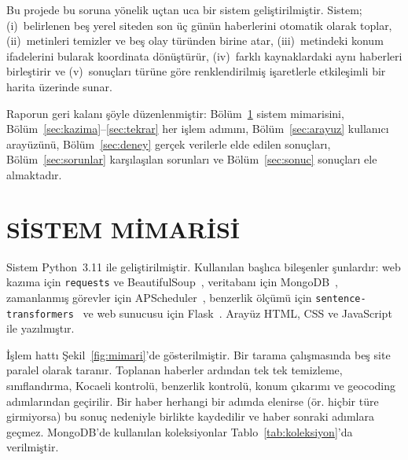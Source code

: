 \documentclass[conference,a4paper]{IEEEtran}
\begin{document}
Bu projede bu soruna yönelik uçtan uca bir sistem geliştirilmiştir. Sistem;
(i)~belirlenen beş yerel siteden son üç günün haberlerini otomatik olarak
toplar, (ii)~metinleri temizler ve beş olay türünden birine atar, (iii)~metindeki
konum ifadelerini bularak koordinata dönüştürür, (iv)~farklı kaynaklardaki aynı
haberleri birleştirir ve (v)~sonuçları türüne göre renklendirilmiş işaretlerle
etkileşimli bir harita üzerinde sunar.

Raporun geri kalanı şöyle düzenlenmiştir: Bölüm~\ref{sec:mimari} sistem mimarisini,
Bölüm~\ref{sec:kazima}--\ref{sec:tekrar} her işlem adımını, Bölüm~\ref{sec:arayuz}
kullanıcı arayüzünü, Bölüm~\ref{sec:deney} gerçek verilerle elde edilen
sonuçları, Bölüm~\ref{sec:sorunlar} karşılaşılan sorunları ve
Bölüm~\ref{sec:sonuc} sonuçları ele almaktadır.

\section{SİSTEM MİMARİSİ}\label{sec:mimari}
Sistem Python~3.11 ile geliştirilmiştir. Kullanılan başlıca bileşenler şunlardır:
web kazıma için \texttt{requests} ve BeautifulSoup~\cite{bs4}, veritabanı için
MongoDB~\cite{mongodb}, zamanlanmış görevler için APScheduler~\cite{apscheduler},
benzerlik ölçümü için \texttt{sentence-transformers}~\cite{sbert} ve web sunucusu
için Flask~\cite{flask}. Arayüz HTML, CSS ve JavaScript ile yazılmıştır.

İşlem hattı Şekil~\ref{fig:mimari}'de gösterilmiştir. Bir tarama çalışmasında beş
site paralel olarak taranır. Toplanan haberler ardından tek tek temizleme,
sınıflandırma, Kocaeli kontrolü, benzerlik kontrolü, konum çıkarımı ve geocoding
adımlarından geçirilir. Bir haber herhangi bir adımda elenirse (ör. hiçbir türe
girmiyorsa) bu sonuç nedeniyle birlikte kaydedilir ve haber sonraki adımlara
geçmez. MongoDB'de kullanılan koleksiyonlar Tablo~\ref{tab:koleksiyon}'da
verilmiştir.
\end{document}
